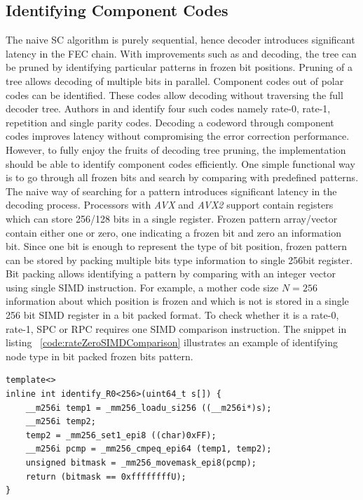 \subsection{Identifying Component Codes}
The naive SC algorithm is purely sequential, hence decoder introduces significant latency in the FEC chain. With improvements such as \cite{fastSSC} and \cite{SSC} decoding, the tree can be pruned by identifying particular patterns in frozen bit positions. Pruning of a tree allows decoding of multiple bits in parallel. Component codes out of polar codes can be identified. These codes allow decoding without traversing the full decoder tree. Authors in \cite{SSC} and \cite{fastSSC} identify four such codes namely rate-0, rate-1, repetition and single parity codes. Decoding a codeword through component codes improves latency without compromising the error correction performance. However, to fully enjoy the fruits of decoding tree pruning, the implementation should be able to identify component codes efficiently. One simple functional way is to go through all frozen bits and search by comparing with predefined patterns. The naive way of searching for a pattern introduces significant latency in the decoding process. Processors with \textit{AVX} and \textit{AVX2} support contain registers which can store 256/128 bits in a single register. Frozen pattern array/vector contain either one or zero, one indicating a frozen bit and zero an information bit. Since one bit is enough to represent the type of bit position, frozen pattern can be stored by packing multiple bits type information to single 256bit register. Bit packing allows identifying a pattern by comparing with an integer vector using single SIMD instruction. For example, a mother code size $N=256$ information about which position is frozen and which is not is stored in a single 256 bit SIMD register in a bit packed format. To check whether it is a rate-0, rate-1, SPC or RPC requires one SIMD comparison instruction. The snippet in listing ~\ref{code:rateZeroSIMDComparison} illustrates an example of identifying node type in bit packed frozen bits pattern.
\begin{code}
	\label{code:rateZeroSIMDComparison}
	\begin{verbatim}
template<>
inline int identify_R0<256>(uint64_t s[]) {
	__m256i temp1 = _mm256_loadu_si256 ((__m256i*)s);
	__m256i temp2;
	temp2 = _mm256_set1_epi8 ((char)0xFF);
	__m256i pcmp = _mm256_cmpeq_epi64 (temp1, temp2);
	unsigned bitmask = _mm256_movemask_epi8(pcmp);
	return (bitmask == 0xffffffffU);
}
\end{verbatim}
\end{code}

